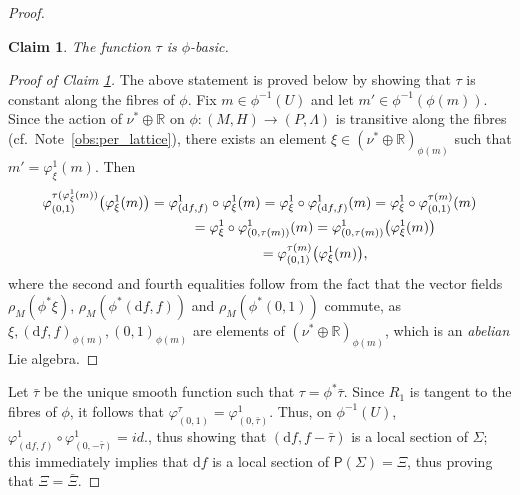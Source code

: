 \documentclass[10pt,a4paper]{amsart}
\numberwithin{equation}{section}
\newtheorem{Claim}[Theorem]{Claim}
\newcommand{\de}{\mathrm{d}} %
\newcommand{\CM}{(M,H)} %
\newcommand{\PM}{(P,\Lambda)} %
\newcommand{\RR}{\mathbb{R}}
\begin{document}
\begin{proof}
 \begin{Claim}\label{claim:basic}
 The function $\tau$ is $\phi$-basic.
 \end{Claim}
\begin{proof}[Proof of Claim \ref{claim:basic}] The above statement is proved below by showing that $\tau$ is constant along the f\/ibres of $\phi$. Fix $m \in \phi^{-1}(U)$ and let $m' \in \phi^{-1}(\phi(m))$. Since the action of $\nu^* \oplus \RR$ on $\phi \colon \CM \to \PM$ is transitive along the f\/ibres (cf.\ Note~\ref{obs:per_lattice}), there exists an element $\xi \in (\nu^* \oplus \RR )_{\phi(m)}$ such that $m' = \varphi^1_{\xi}(m)$. Then
 \begin{gather*} %
 \varphi^{\tau (\varphi^1_{\xi}(m) )}_{(0,1)} \big(\varphi^1_{\xi}(m) \big) = \varphi^1_{(\de f, f)}\circ \varphi^1_{\xi}(m) =
 \varphi^1_{\xi} \circ \varphi^1_{(\de f, f)}(m) = \varphi^1_{\xi} \circ \varphi^{\tau(m)}_{(0,1)}(m) \\
\hphantom{\varphi^{\tau (\varphi^1_{\xi}(m) )}_{(0,1)} \big(\varphi^1_{\xi}(m) \big)}{} = \varphi^1_{\xi} \circ \varphi^{1}_{(0,\tau(m))}(m) =
 \varphi^{1}_{(0,\tau(m))} \big(\varphi^1_{\xi}(m)\big) \\
\hphantom{\varphi^{\tau (\varphi^1_{\xi}(m) )}_{(0,1)} \big(\varphi^1_{\xi}(m) \big)}{} = \varphi^{\tau(m)}_{(0,1)} \big(\varphi^1_{\xi}(m) \big) ,
 \end{gather*}
where the second and fourth equalities follow from the fact that the vector f\/ields $\rho_M(\phi^*\xi)$, $\rho_M(\phi^*(\de f,f))$ and $\rho_M(\phi^*(0,1))$ commute, as $\xi, (\de f,f)_{\phi(m)}, (0,1)_{\phi(m)}$ are elements of $(\nu^* \oplus \RR)_{\phi(m)}$, which is an {\it abelian} Lie algebra.
 \end{proof}

Let $\bar{\tau}$ be the unique smooth function such that $\tau = \phi^*\bar{\tau}$. Since $R_1$ is tangent to the f\/ibres of $\phi$, it follows that $\varphi^{\tau}_{(0,1)} = \varphi^1_{(0,\bar{\tau})}$. Thus, on $\phi^{-1}(U)$, $\varphi^1_{(\de f,f)} \circ \varphi^1_{(0,-\bar{\tau})} = id.$, thus showing that $(\de f, f - \bar{\tau})$ is a local section of $\Sigma$; this immediately implies that $\de f$ is a local section of $\mathsf{P}(\Sigma) =\Xi$, thus proving that $\Xi = \bar{\Xi}$.


\end{proof}
\end{document}
